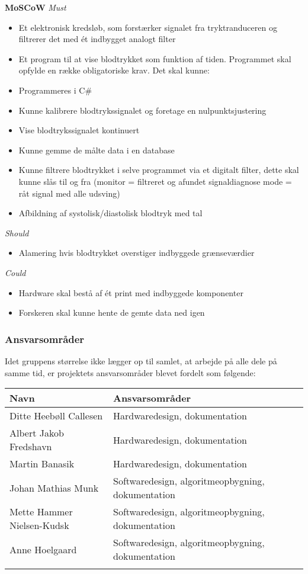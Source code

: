 \textbf{MoSCoW}
\textit{Must}
\begin{itemize}
\item Et elektronisk kredsløb, som forstærker signalet fra tryktranduceren og filtrerer det med ét indbygget analogt filter
\item Et program til at vise blodtrykket som funktion af tiden. Programmet skal opfylde en række obligatoriske krav. Det skal kunne:
\end{itemize}
\begin{itemize}
\item Programmeres i C\#
\item Kunne kalibrere blodtrykssignalet og foretage en nulpunktsjustering
\item Vise blodtrykssignalet kontinuert
\item Kunne gemme de målte data i en database
\item Kunne filtrere blodtrykket i selve programmet via et digitalt filter, dette skal kunne slås til og fra (monitor = filtreret og afundet signaldiagnose mode = råt signal med alle udsving)
\item Afbildning af systolisk/diastolisk blodtryk med tal
\end{itemize}
\textit{Should}
\begin{itemize}
\item Alamering hvis blodtrykket overstiger indbyggede grænseværdier
\end{itemize}
\textit{Could}
\begin{itemize}
\item Hardware skal bestå af ét print med indbyggede komponenter
\item Forskeren skal kunne hente de gemte data ned igen
\end{itemize} 

\subsubsection{Ansvarsområder}

Idet gruppens størrelse ikke lægger op til samlet, at arbejde på alle dele på samme tid, er projektets ansvarsområder blevet fordelt som følgende:

\begin{longtabu} to 
    Navn &    Ansvarsområder &    \\[-1ex]
    \midrule
    Ditte Heebøll Callesen &   Hardwaredesign, dokumentation	&    \\
    Albert Jakob Fredshavn &   Hardwaredesign, dokumentation	&    \\
    Martin Banasik         &   Hardwaredesign, dokumentation	&    \\
    Johan Mathias Munk     &   Softwaredesign, algoritmeopbygning, dokumentation &    \\
    Mette Hammer Nielsen-Kudsk &   Softwaredesign, algoritmeopbygning, dokumentation &    \\
   	Anne Hoelgaard    &   Softwaredesign, algoritmeopbygning, dokumentation	&    \\
\label{version_Systemark}
\end{longtabu}